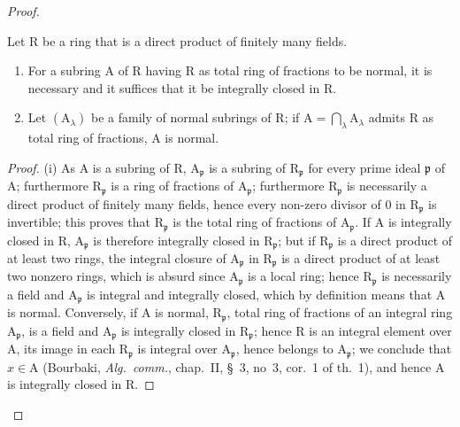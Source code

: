 \begin{proof}
\begin{lemma}[6.14.1.1]
\label{IV.6.14.1.1}
Let $\mathrm{R}$ be a ring that is a direct product of finitely many fields.
\begin{enumerate}[label=(\roman*)]
  \item For a subring $\mathrm{A}$ of $\mathrm{R}$ having $\mathrm{R}$ as total ring of fractions to be normal,
it is necessary and it suffices that it be integrally closed in $\mathrm{R}$.
  \item Let $(\mathrm{A}_\lambda)$ be a family of normal subrings of $\mathrm{R}$; if $\mathrm{A}=\bigcap_\lambda\mathrm{A}_\lambda$ admits $\mathrm{R}$ as
total ring of fractions, $\mathrm{A}$ is normal.
\end{enumerate}
\end{lemma}

\begin{proof}
(i) As $\mathrm{A}$ is a subring of $\mathrm{R}$, $\mathrm{A}_\mathfrak{p}$ is a subring of $\mathrm{R}_\mathfrak{p}$ for every
prime ideal $\mathfrak{p}$ of $\mathrm{A}$; furthermore $\mathrm{R}_\mathfrak{p}$ is a ring of fractions of $\mathrm{A}_\mathfrak{p}$; furthermore $\mathrm{R}_\mathfrak{p}$ is necessarily
a direct product of finitely many fields, hence every non-zero divisor
of $0$ in $\mathrm{R}_\mathfrak{p}$ is invertible; this proves that $\mathrm{R}_\mathfrak{p}$ is the total ring of fractions of $\mathrm{A}_\mathfrak{p}$.
If $\mathrm{A}$ is integrally closed in $\mathrm{R}$, $\mathrm{A}_\mathfrak{p}$ is therefore integrally closed in $\mathrm{R}_\mathfrak{p}$; but
if $\mathrm{R}_\mathfrak{p}$ is a direct product of at least two rings, the integral closure of $\mathrm{A}_\mathfrak{p}$ in $\mathrm{R}_\mathfrak{p}$ is
a direct product of at least two nonzero rings, which is absurd since $\mathrm{A}_\mathfrak{p}$
is a local ring; hence $\mathrm{R}_\mathfrak{p}$ is necessarily a field and $\mathrm{A}_\mathfrak{p}$ is integral and integrally
closed, which by definition means that $\mathrm{A}$ is normal. Conversely, if $\mathrm{A}$ is normal,
$\mathrm{R}_\mathfrak{p}$, total ring of fractions of an integral ring $\mathrm{A}_\mathfrak{p}$, is a field and $\mathrm{A}_\mathfrak{p}$ is integrally
closed in $\mathrm{R}_\mathfrak{p}$; hence $\mathrm{R}$ is an integral element over $\mathrm{A}$, its image in each $\mathrm{R}_\mathfrak{p}$ is
integral over $\mathrm{A}_\mathfrak{p}$, hence belongs to $\mathrm{A}_\mathfrak{p}$; we conclude that $x\in\mathrm{A}$ (Bourbaki, \emph{Alg.~comm.},
chap.~II, \S~3, no~3, cor.~1 of th.~1), and hence $\mathrm{A}$ is integrally closed in $\mathrm{R}$.


\end{proof}
\end{proof}
